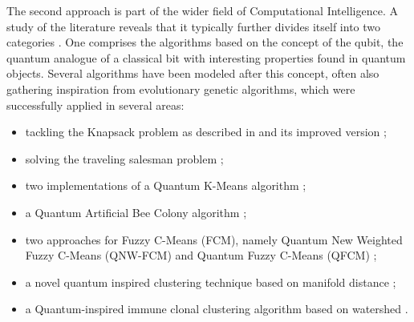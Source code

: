 The second approach is part of the wider field of Computational Intelligence.
A study of the literature reveals that it typically further divides itself into two categories \cite{Casper2013}. 
One comprises the algorithms based on the concept of the qubit, the quantum analogue of a classical bit with interesting properties found in quantum objects.
Several algorithms have been modeled after this concept, often also gathering inspiration from evolutionary genetic algorithms, which were successfully applied in several areas:
\begin{itemize}
	\item tackling the Knapsack problem as described in \citet{Han2000} and its improved version \cite{Liu2010};

	\item solving the traveling salesman problem \cite{Talbi2004};

    \item two implementations of a Quantum K-Means algorithm \cite{Casper2012KMeans,Xiao2010};

    \item a Quantum Artificial Bee Colony algorithm \cite{hung2013quantum,Casper2013};

    \item two approaches for Fuzzy C-Means (FCM), namely Quantum New Weighted Fuzzy C-Means (QNW-FCM) \cite{Casper2013} and Quantum Fuzzy C-Means (QFCM) \cite{hung2013quantumcmeans,Casper2013};

    \item a novel quantum inspired clustering technique based on manifold distance \cite{Liang2009};

    \item a Quantum-inspired immune clonal clustering algorithm based on watershed \cite{Li2010}.
\end{itemize}

